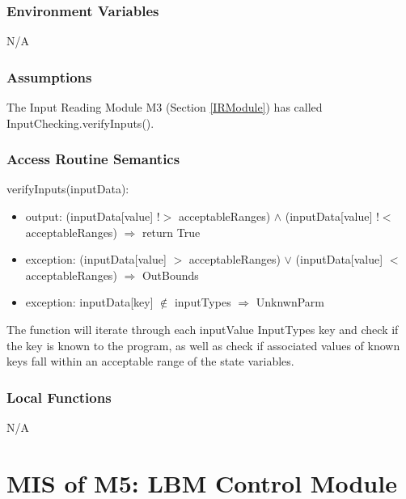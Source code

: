 \documentclass[12pt, titlepage]{article}
\begin{document}
\subsubsection{Environment Variables}
N/A

\subsubsection{Assumptions}

The Input Reading Module M3 (Section \ref{IRModule}) has called
InputChecking.verifyInputs().  

\subsubsection{Access Routine Semantics}

\noindent verifyInputs(inputData):
\begin{itemize}
	\item output: (inputData[value] $!>$ acceptableRanges) $\land$ (inputData[value] $!<$ acceptableRanges) $\Rightarrow$ return True
	\item exception: (inputData[value] $>$ acceptableRanges) $\lor$ (inputData[value] $<$ acceptableRanges) $\Rightarrow$ OutBounds
	\item exception: inputData[key] $\notin$ inputTypes $\Rightarrow$ UnknwnParm
\end{itemize} 

The function will iterate through each inputValue InputTypes key and check if
the key is known to the program, as well as check if associated values of known
keys fall within an acceptable range of the state variables.

\subsubsection{Local Functions}

N/A

\newpage

\section{MIS of M5: LBM Control Module} \label{LCModule}
\end{document}

